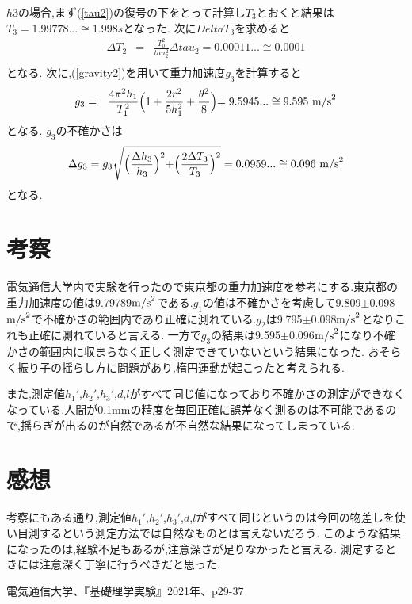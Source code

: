 \documentclass[a4j,10pt]{jarticle}
\begin{document}
$h3$の場合,まず(\ref{tau2})の復号の下をとって計算し$T_3$とおくと結果は$T_3=1.99778...\cong1.998s$となった.
次に$DeltaT_3$を求めると
\begin{eqnarray*}
  \Delta T_2 &=& \frac {T_0^2}{tau_2^2}\Delta tau_2 = 0.00011...\cong 0.0001 \\
\end{eqnarray*}
となる.
次に,(\ref{gravity2})を用いて重力加速度$g_3$を計算すると
\begin{eqnarray*}
  g_3  &=& \frac{4 \pi^2 h_1}{T_1^2} \Bigl(1 + \frac{2r^2}{5h_1^2} + \frac{\theta^2}{8} \Bigl) = 9.5945...\cong9.595\ {\rm m/s}^2 \\
\end{eqnarray*}
となる.
$g_3$の不確かさは
\begin{eqnarray*}
  \Delta g_3= g_3 \sqrt{\Bigl( \frac{\Delta h_3}{h_3} \Bigl)^2+\Bigl( \frac{2\Delta T_3}{T_3}\Bigl)^2 } = 0.0959...\cong0.096\ {\rm m/s}^2  \\
\end{eqnarray*}
となる.

\section{考察}
電気通信大学内で実験を行ったので東京都の重力加速度を参考にする.東京都の重力加速度の値は9.79789${\rm m/s}^2$である.$g_1$の値は不確かさを考慮して9.809$\pm$0.098${\rm m/s}^2$で不確かさの範囲内であり正確に測れている.$g_2$は9.795$\pm$0.098${\rm m/s}^2$となりこれも正確に測れていると言える.
一方で$g_3$の結果は9.595$\pm$0.096${\rm m/s}^2$になり不確かさの範囲内に収まらなく正しく測定できていないという結果になった.
おそらく振り子の揺らし方に問題があり,楕円運動が起こったと考えられる.

また,測定値$h_1'$,$h_2'$,$h_3'$,$d$,$l$がすべて同じ値になっており不確かさの測定ができなくなっている.人間が0.1mmの精度を毎回正確に誤差なく測るのは不可能であるので,揺らぎが出るのが自然であるが不自然な結果になってしまっている.
\section{感想}
考察にもある通り,測定値$h_1'$,$h_2'$,$h_3'$,$d$,$l$がすべて同じというのは今回の物差しを使い目測するという測定方法では自然なものとは言えないだろう.
このような結果になったのは,経験不足もあるが,注意深さが足りなかったと言える.
測定するときには注意深く丁寧に行うべきだと思った.
  

\begin{thebibliography}{9}
 電気通信大学、『基礎理学実験』2021年、p29-37
\end{thebibliography}
\end{document}
